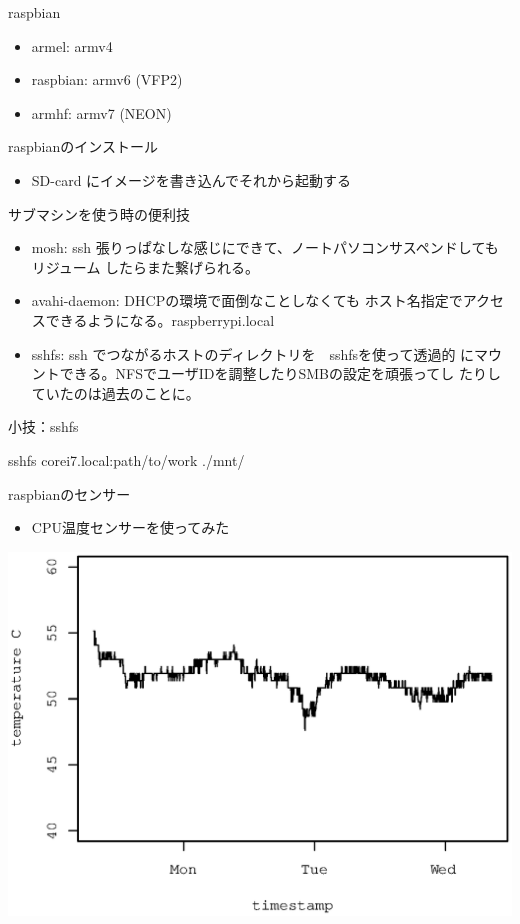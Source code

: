 \begin{frame}{raspbian}
 \begin{itemize}
  \item armel: armv4
  \item raspbian: armv6 (VFP2)
  \item armhf: armv7 (NEON)
 \end{itemize}
\end{frame}

\begin{frame}{raspbianのインストール}
\begin{itemize}
 \item SD-card にイメージを書き込んでそれから起動する
\end{itemize}
\end{frame}

\begin{frame}{サブマシンを使う時の便利技}
\begin{itemize}
 \item mosh: ssh 張りっぱなしな感じにできて、ノートパソコンサスペンドしてもリジューム
       したらまた繋げられる。
 \item avahi-daemon: DHCPの環境で面倒なことしなくても
       ホスト名指定でアクセスできるようになる。raspberrypi.local 
 \item sshfs: ssh でつながるホストのディレクトリを　sshfsを使って透過的
       にマウントできる。NFSでユーザIDを調整したりSMBの設定を頑張ってし
       たりしていたのは過去のことに。
\end{itemize}
\end{frame}


\begin{frame}[containsverbatim]{小技：sshfs}
\begin{commandline}
 sshfs corei7.local:path/to/work ./mnt/
\end{commandline}
\end{frame}

\begin{frame}{raspbianのセンサー}
\begin{itemize}
 \item CPU温度センサーを使ってみた
\end{itemize}
  \includegraphics[width=0.8\hsize]{image201307/temperature.eps}
\end{frame}

